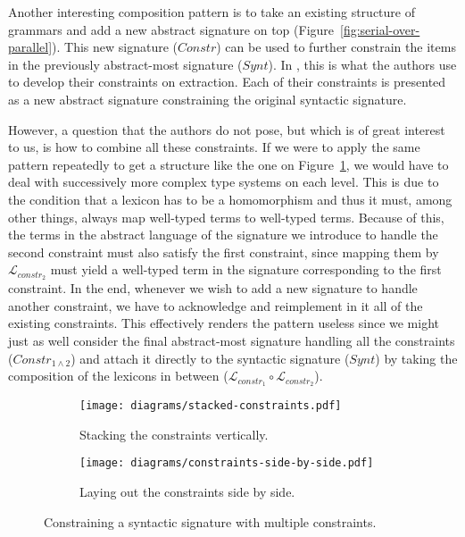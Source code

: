 Another interesting composition pattern is to take an existing structure
of grammars and add a new abstract signature on top
(Figure~\ref{fig:serial-over-parallel}). This new signature ($Constr$)
can be used to further constrain the items in the previously
abstract-most signature ($Synt$). In \cite{pogodalla2012controlling},
this is what the authors use to develop their constraints on
extraction. Each of their constraints is presented as a new abstract
signature constraining the original syntactic signature.

However, a question that the authors do not pose, but which is of great
interest to us, is how to combine all these constraints. If we were to
apply the same pattern repeatedly to get a structure like the one on
Figure~\ref{fig:stacked-constraints}, we would have to deal with
successively more complex type systems on each level. This is due to the
condition that a lexicon has to be a homomorphism and thus it must,
among other things, always map well-typed terms to well-typed
terms. Because of this, the terms in the abstract language of the
signature we introduce to handle the second constraint must also satisfy
the first constraint, since mapping them by $\mathcal{L}_{constr_2}$
must yield a well-typed term in the signature corresponding to the first
constraint. In the end, whenever we wish to add a new signature to
handle another constraint, we have to acknowledge and reimplement in it
all of the existing constraints. This effectively renders the pattern
useless since we might just as well consider the final abstract-most
signature handling all the constraints ($Constr_{1 \land 2}$) and attach
it directly to the syntactic signature ($Synt$) by taking the
composition of the lexicons in between ($\mathcal{L}_{constr_1} \circ
\mathcal{L}_{constr_2}$).

\begin{figure}[t]
  \centering
  \begin{subfigure}[b]{0.4\textwidth}
    \centering
    \texttt{[image: diagrams/stacked-constraints.pdf]}
    \caption{\label{fig:stacked-constraints} Stacking the constraints
      vertically.}
  \end{subfigure}
  \qquad
  \begin{subfigure}[b]{0.4\textwidth}
    \centering
    \texttt{[image: diagrams/constraints-side-by-side.pdf]}
    \caption{\label{fig:constraints-side-by-side} Laying out the
      constraints side by side.}
  \end{subfigure}
  \caption{Constraining a syntactic signature with multiple
    constraints.}
\end{figure}

